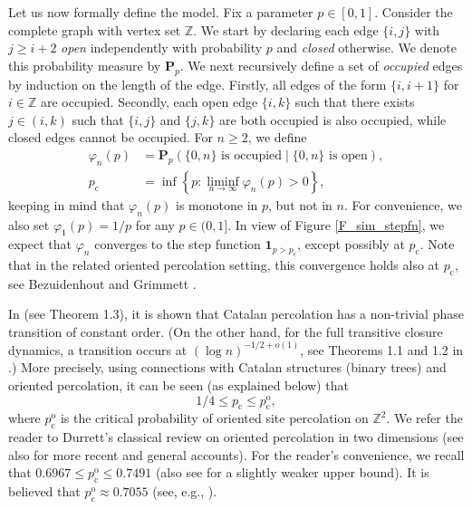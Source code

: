 \documentclass[pdflatex,sn-mathphys-num]{sn-jnl}%
\newcommand{\bbZ}{{\ensuremath{\mathbb Z}} }
\newcommand{\bfP}{\mathbf{P}}
\newcommand{\1}{{\ensuremath{\mathbf{1}}} }
\newcommand{\pc}{\ensuremath{p_{\mathrm{c}} }}
\newcommand{\pco}{\ensuremath{p_{\mathrm{c}}^{\mathrm{o}} }}
\theoremstyle{thmstyleone}%
\theoremstyle{thmstyletwo}%
\theoremstyle{thmstylethree}%
\begin{document}
Let us now formally define the model. 
Fix a parameter $p\in[0,1]$. Consider the complete graph with vertex set $\bbZ$. We start by declaring each edge $\{i,j\}$ with $j\ge i+2$ \emph{open} independently with probability $p$ and \emph{closed} otherwise. We denote this probability measure by $\bfP_p$. We next recursively define a set of \emph{occupied} edges by induction on the length of the edge. Firstly, all edges of the form $\{i,i+1\}$ for $i\in\bbZ$ are occupied. Secondly, each open edge $\{i,k\}$ such that there exists $j\in(i,k)$ such that $\{i,j\}$ and $\{j,k\}$ are both occupied is also occupied, while closed edges cannot be occupied. For $n\ge 2$, we define
\begin{align}
\label{eq:def:theta}\varphi_n(p)&{}=\bfP_p\left(\{0,n\}\text{ is occupied}\mid \{0,n\}\text{ is open}\right),\\
\label{eq:def:pc}\pc&{}=\inf \left\{p: \liminf_{n\to \infty} \varphi_n(p)>0 \right\},
\end{align}
keeping in mind that $\varphi_n(p)$ is monotone in $p$, but not  in $n$. For convenience, we also set $\varphi_1(p)=1/p$ for any $p\in(0,1]$. In view of Figure \ref{F_sim_stepfn}, we expect that $\varphi_n$ converges to the step function $\1_{p>\pc}$, except possibly at $\pc$. Note that in the related oriented percolation setting, this convergence holds also at $\pc$, see 
Bezuidenhout and Grimmett \cite{Bezuidenhout90}.

In \cite{Gravner23} (see Theorem 1.3), it is shown that Catalan percolation has 
a non-trivial phase transition of constant order.  
(On the other hand, for the full transitive closure dynamics, a transition occurs
at $(\log n)^{-1/2+o(1)}$, see Theorems 1.1 and 1.2 in \cite{Gravner23}.) More precisely, using connections with Catalan structures (binary trees) and oriented percolation, 
it can be seen   
(as explained below)  
that 
\begin{equation}\label{eq:GK}1/4\le \pc\le\pco,\end{equation}
where $\pco$ is the critical probability of oriented site percolation on $\bbZ^2$. We refer the reader to Durrett's  classical review \cite{Durrett84} on oriented percolation in two dimensions (see also 
\cite{Liggett99,Liggett05,Hartarsky22GOSP} for more recent and general accounts). For the reader's convenience, we recall that $0.6967\le \pco\le 0.7491$ \cite{Couronne23,Balister94} (also see \cite{Liggett95} for a slightly weaker upper bound). It is believed that $\pco\approx0.7055$ (see, e.g., \cite{Essam88}).
\end{document}
